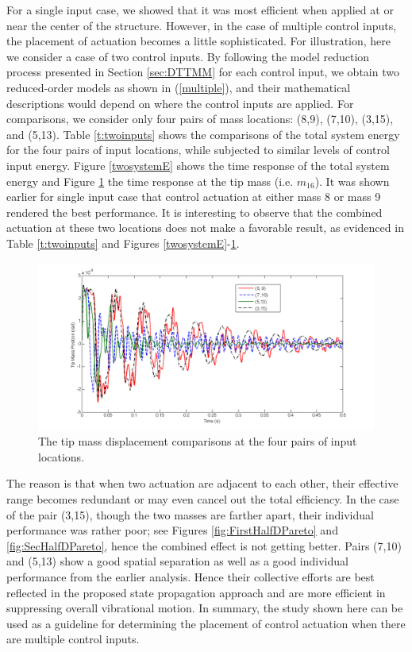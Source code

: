 \documentclass[11pt]{ucthesis}
\begin{document}
For a single input case, we showed that it was most efficient when applied at or near the center of the structure. However, in the case of multiple control inputs, the placement of actuation becomes a little sophisticated. For illustration, here we consider a case of two control inputs. By following the model reduction process presented in Section \ref{sec:DTTMM} for each control input, we obtain two reduced-order models as shown in (\ref{multiple}), and their mathematical descriptions would depend on where the control inputs are applied. For comparisons, we consider only four pairs of mass locations: (8,9), (7,10), (3,15), and (5,13). Table \ref{t:twoinputs} shows the comparisons of the total system energy for the four pairs of input locations, while subjected to similar levels of control input energy. Figure \ref{twosystemE} shows the time response of the total system energy and Figure \ref{twosystemP} the time response at the tip mass (i.e. $m_{16}$). It was shown earlier for single input case that control actuation at either mass 8 or mass 9 rendered the best performance. It is interesting to observe that the combined actuation at these two locations does not make a favorable result, as evidenced in Table \ref{t:twoinputs} and Figures \ref{twosystemE}-\ref{twosystemP}. 
\begin{figure}[thpb]
\centering
\includegraphics[width=0.9\linewidth]{Figures/twoinput_tip.png}
\caption{The tip mass displacement comparisons at the four pairs of input locations.}
\label{twosystemP}
\end{figure}
The reason is that when two actuation are adjacent to each other, their effective range becomes redundant or may even cancel out the total efficiency. In the case of the pair (3,15), though the two masses are farther apart, their individual performance was rather poor; see Figures \ref{fig:FirstHalfDPareto} and \ref{fig:SecHalfDPareto}, hence the combined effect is not getting better. Pairs (7,10) and (5,13) show a good spatial separation as well as a good individual performance from the earlier analysis. Hence their collective efforts are best reflected in the proposed state propagation approach and are more efficient in suppressing overall vibrational motion. In summary, the study shown here can be used as a guideline for determining the placement of control actuation when there are multiple control inputs.
\end{document}
